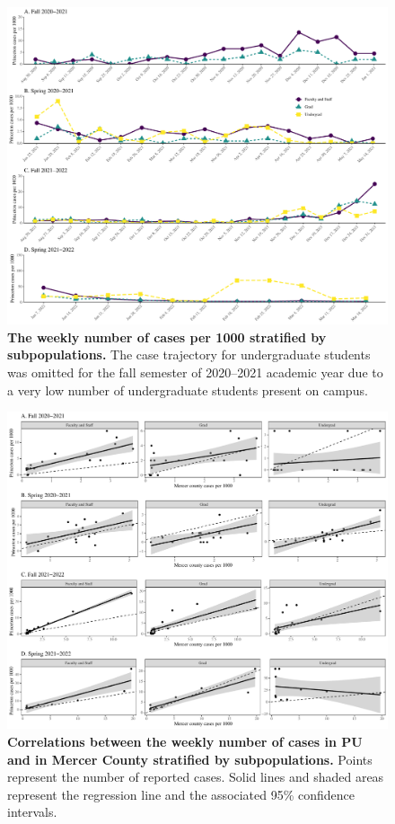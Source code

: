 \documentclass[12pt]{article}
\begin{document}
\begin{figure}[!htp]
\includegraphics[width=\textwidth]{../figure_princeton_new/figure_princeton_new_per_1000_bypop.pdf}
\caption{
\textbf{The weekly number of cases per 1000 stratified by subpopulations.}
The case trajectory for undergraduate students was omitted for the fall semester of 2020--2021 academic year due to a very low number of undergraduate students present on campus.
}
\end{figure}

\pagebreak

\begin{figure}[!htp]
\includegraphics[width=\textwidth]{../figure_princeton_new/figure_princeton_correlation_per_1000.pdf}
\caption{
\textbf{Correlations between the weekly number of cases in PU and in Mercer County stratified by subpopulations.}
Points represent the number of reported cases.
Solid lines and shaded areas represent the regression line and the associated 95\% confidence intervals.
}
\end{figure}
\end{document}
